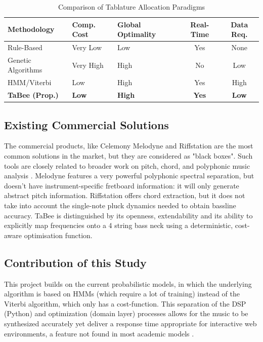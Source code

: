 \documentclass[a4paper, 12pt, titlepage]{article}
\begin{document}
\begin{table}[H]
    \centering
    \begin{tabularx}{\textwidth}{|l|X|X|c|c|}
        \hline
        \textbf{Methodology} & \textbf{Comp. Cost} & \textbf{Global Optimality} & \textbf{Real-Time} & \textbf{Data Req.} \\
        \hline
        Rule-Based & Very Low & Low & Yes & None \\
        \hline
        Genetic Algorithms & Very High & High & No & Low \\
        \hline
        HMM/Viterbi & Low & High & Yes & High \\
        \hline
        \textbf{TaBee (Prop.)} & \textbf{Low} & \textbf{High} & \textbf{Yes} & \textbf{Low} \\
        \hline
    \end{tabularx}
    \caption{Comparison of Tablature Allocation Paradigms}
    \label{tab:comparison}
\end{table}

\subsection{Existing Commercial Solutions}
The commercial products, like Celemony Melodyne and Riffstation are the most common solutions in the market, but they are considered as "black boxes". Such tools are closely related to broader work on pitch, chord, and polyphonic music analysis \cite{fujishima1999,poliner2007}. Melodyne features a very powerful polyphonic spectral separation, but doesn't have instrument-specific fretboard information: it will only generate abstract pitch information. Riffstation offers chord extraction, but it does not take into account the single-note pluck dynamics needed to obtain bassline accuracy. TaBee is distinguished by its openness, extendability and its ability to explicitly map frequencies onto a 4 string bass neck using a deterministic, cost-aware optimisation function.

\subsection{Contribution of this Study}
This project builds on the current probabilistic models, in which the underlying algorithm is based on HMMs (which require a lot of training) instead of the Viterbi algorithm, which only has a cost-function. This separation of the DSP (Python) and optimization (domain layer) processes allows for the music to be synthesized accurately yet deliver a response time appropriate for interactive web environments, a feature not found in most academic models \cite{hori2013,nakamura2014,skarha2018}.
\end{document}
